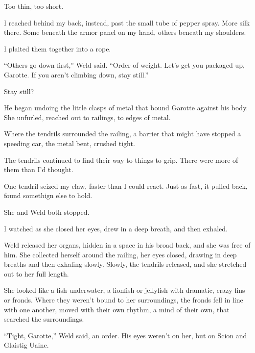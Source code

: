Too thin, too short.



I reached behind my back, instead, past the small tube of pepper spray.  More silk there.  Some beneath the armor panel on my hand, others beneath my shoulders.



I plaited them together into a rope.



``Others go down first,'' Weld said.  ``Order of weight.  Let's get you packaged up, Garotte.  If you aren't climbing down, stay still.''



Stay still?



He began undoing the little clasps of metal that bound Garotte against his body.  She unfurled, reached out to railings, to edges of metal.



Where the tendrils surrounded the railing, a barrier that might have stopped a speeding car, the metal bent, crushed tight.



The tendrils continued to find their way to things to grip.  There were more of them than I'd thought.



One tendril seized my claw, faster than I could react.  Just as fast, it pulled back, found somethign else to hold.



She and Weld both stopped.



I watched as she closed her eyes, drew in a deep breath, and then exhaled.



Weld released her organs, hidden in a space in his broad back, and she was free of him.  She collected herself around the railing, her eyes closed, drawing in deep breaths and then exhaling slowly.  Slowly, the tendrils released, and she stretched out to her full length.



She looked like a fish underwater, a lionfish or jellyfish with dramatic, crazy fins or fronds.  Where they weren't bound to her surroundings, the fronds fell in line with one another, moved with their own rhythm, a mind of their own, that searched the surroundings.



``Tight, Garotte,'' Weld said, an order.  His eyes weren't on her, but on Scion and Glaistig Uaine.




